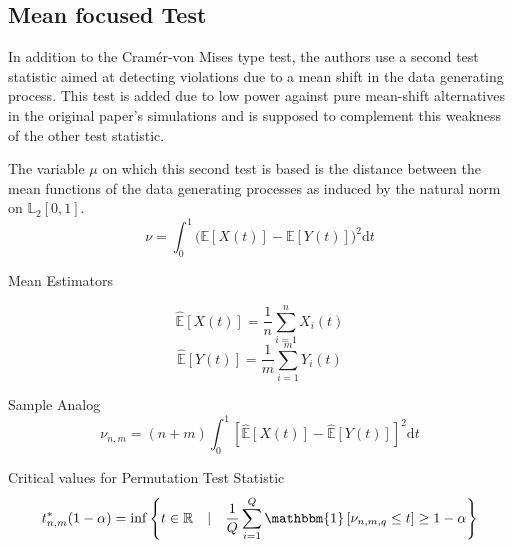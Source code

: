 \documentclass[12pt, a4paper]{article}
\theoremstyle{MAstyle} \newtheorem{assumption}{Assumption}[section]
\theoremstyle{MAstyle} \newtheorem{definition}{Definition}[section]
\theoremstyle{MAstyle} \newtheorem{theorem}{Theorem}[section]
\begin{document}
		\subsection{Mean focused Test}
			In addition to the Cram\'{e}r-von Mises type test, the authors use a second test statistic aimed at detecting violations due to a mean shift in the data generating process. This test is added due to low power against pure mean-shift alternatives in the original paper's simulations and is supposed to complement this weakness of the other test statistic.
			
			The variable $\mu$ on which this second test is based is the distance between the mean functions of the data generating processes as induced by the natural norm on $\mathbb{L}_2[0,1]$.
			\begin{equation}
				\nu = \int_{0}^{1} \big(\mathbb{E}\left[X(t)\right] - \mathbb{E}\left[Y(t)\right]\big)^2 \mathrm{d}t
			\end{equation}
		
			Mean Estimators
			\begin{multicols}{2}
				\noindent
				\begin{equation*}
					\hat{\mathbb{E}}\left[X(t)\right] = \frac{1}{n}\sum_{i = 1}^{n} X_i(t)
				\end{equation*}
				\begin{equation}
					\hat{\mathbb{E}}\left[Y(t)\right] = \frac{1}{m}\sum_{i = 1}^{m} Y_i(t)
				\end{equation}
			\end{multicols}
		
			Sample Analog
			\begin{equation}
				\nu_{n,m} = (n+m) \int_{0}^{1} \left[\hat{\mathbb{E}}\left[X(t)\right] - \hat{\mathbb{E}}\left[Y(t)\right] \right]^2 \mathrm{d}t
			\end{equation}
		
			Critical values for Permutation Test Statistic
			\begin{equation}
				t^{*}_{n,m}(1-\alpha) = \inf \left\{t \in \mathbb{R} \quad \vert \quad \frac{1}{Q} \sum_{i = 1}^{Q} \mathbbm{1}\left[\nu_{n,m,q} \leq t\right] \geq 1 - \alpha \right\}
			\end{equation}
		
\end{document}
